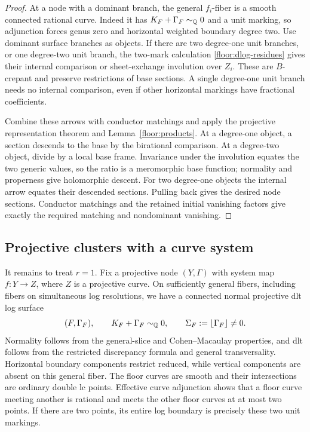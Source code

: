 \begin{proof}
At a node with a dominant branch, the general
$f_i$-fiber is a smooth connected rational curve.
Indeed it has
$K_F+\Gamma_F\sim_{\mathbb{Q}}0$ and a unit marking, so
adjunction forces genus zero and horizontal weighted
boundary degree two.  Use dominant surface branches
as objects.  If there are two degree-one unit
branches, or one degree-two unit branch, the
two-mark calculation
\eqref{floor:dlog-residues} gives their internal
comparison or sheet-exchange involution over $Z_i$.
These are $B$-crepant and preserve restrictions of
base sections.  A single degree-one unit branch
needs no internal comparison, even if other
horizontal markings have fractional coefficients.

Combine these arrows with conductor matchings and
apply the projective representation theorem and
Lemma~\ref{floor:products}.  At a degree-one object,
a section descends to the base by the birational
comparison.  At a degree-two object, divide by a
local base frame.  Invariance under the involution
equates the two generic values, so the ratio is a
meromorphic base function; normality and properness
give holomorphic descent.  For two degree-one
objects the internal arrow equates their descended
sections.  Pulling back gives the desired node
sections.  Conductor matchings and the retained
initial vanishing factors give exactly the required
matching and nondominant vanishing.
\end{proof}

\subsection{Projective clusters with a curve system}

It remains to treat $r=1$.  Fix a projective node
$(Y,\Gamma)$ with system map $f:Y\to Z$, where $Z$
is a projective curve.  On sufficiently general fibers,
including fibers on simultaneous log resolutions, we
have a connected normal projective dlt log surface
\begin{equation}
 \label{floor:surface-fiber}
 (F,\Gamma_F),\qquad
 K_F+\Gamma_F\sim_{\mathbb{Q}}0,\qquad
 \Sigma_F:=\lfloor\Gamma_F\rfloor\ne0.
\end{equation}
Normality follows from the general-slice and
Cohen--Macaulay properties, and dlt follows from the
restricted discrepancy formula and general
transversality.  Horizontal boundary components
restrict reduced, while vertical components are
absent on this general fiber.  The floor curves are
smooth and their intersections are ordinary double
lc points.  Effective curve adjunction shows that a
floor curve meeting another is rational and meets
the other floor curves at at most two points.  If
there are two points, its entire log boundary is
precisely these two unit markings.

